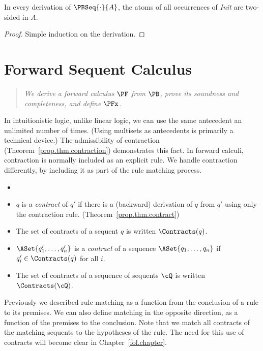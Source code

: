 \begin{theorem}
  In every derivation of $\PBSeq{\cdot}{A}$, the atoms of all
  occurrences of \emph{Init} are two-sided in $A$.
\end{theorem}
\begin{proof} Simple induction on the derivation. \end{proof}

\section{Forward Sequent Calculus}

\begin{quote}
  \textit{
    We derive a forward calculus $\PF$ from $\PB$, prove its soundness
    and completeness, and define $\PFx$.
  }
\end{quote}

\noindent
In intuitionistic logic, unlike linear logic, we can use the same antecedent an unlimited
number of times.  (Using multisets as antecedents is primarily a technical device.)
The admissibility of contraction (Theorem~\ref{prop.thm.contraction})
demonstrates this fact.  In forward calculi, contraction is normally
included as an explicit rule.  We handle contraction differently, by including
it as part of the rule matching process.

\begin{definition}[Contracts]
  \begin{itemize}
  \item[]
  \item $q$ is a \emph{contract} of $q'$ if there is a (backward)
    derivation of $q$ from $q'$ using only the contraction rule.
    (Theorem~\ref{prop.thm.contract})
  \item The set of contracts of a sequent $q$ is
    written $\Contracts(q)$.
  \item $\ASet{q_1', \ldots, q_n'}$ is a \emph{contract} of a
    sequence $\ASet{q_1, \ldots, q_n}$ if $q_i'\in\Contracts(q)$
    for all $i$.
  \item The set of contracts of a sequence of sequents $\cQ$ is
    written $\Contracts(\cQ)$.
  \end{itemize}
\end{definition}

\noindent
Previously we described rule matching as a function from the conclusion of a
rule to its premises.  We can also define matching in the opposite direction, as
a function of the premises to the conclusion.  Note that we match all contracts
of the matching sequents to the hypotheses of the rule.  The need for this use
of contracts will become clear in Chapter~\ref{fol.chapter}.


